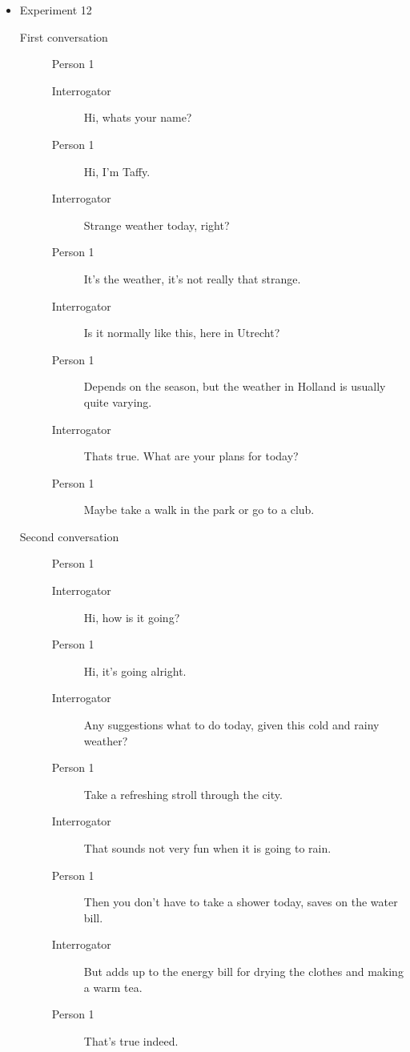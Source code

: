 \begin{itemize}
   \item Experiment 12
      \begin{description}
         \item [First conversation] Person 1
            \begin{description}
               \item [Interrogator] Hi, whats your name?
               \item [Person 1] Hi, I'm Taffy.
               \item [Interrogator] Strange weather today, right?
               \item [Person 1] It's the weather, it's not really that strange.
               \item [Interrogator] Is it normally like this, here in Utrecht?
               \item [Person 1] Depends on the season, but the weather in Holland is usually quite varying.
               \item [Interrogator] Thats true. What are your plans for today?
               \item [Person 1] Maybe take a walk in the park or go to a club.
            \end{description}
         \item [Second conversation] Person 1
            \begin{description}
               \item [Interrogator] Hi, how is it going?
               \item [Person 1] Hi, it's going alright.
               \item [Interrogator] Any suggestions what to do today, given this cold and rainy weather?
               \item [Person 1] Take a refreshing stroll through the city.
               \item [Interrogator] That sounds not very fun when it is going to rain.
               \item [Person 1] Then you don't have to take a shower today, saves on the water bill.
               \item [Interrogator] But adds up to the energy bill for drying the clothes and making a warm tea.
               \item [Person 1] That's true indeed.
            \end{description}
      \end{description}


\end{itemize}
